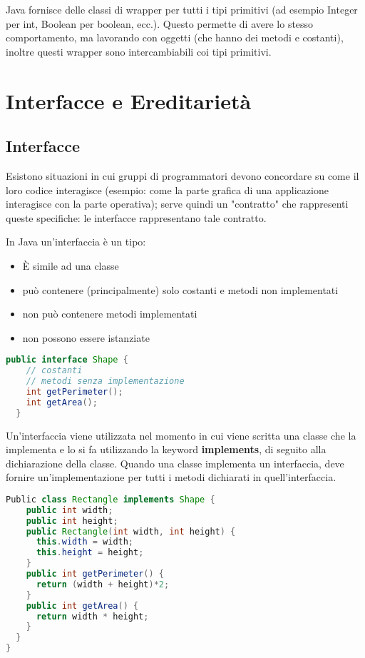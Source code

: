 \documentclass[a4paper,12pt,twoside]{book}
\begin{document}
Java fornisce delle classi di wrapper per tutti i tipi primitivi (ad
esempio Integer per int, Boolean per boolean, ecc.).  Questo permette
di avere lo stesso comportamento, ma lavorando con oggetti (che hanno
dei metodi e costanti), inoltre questi wrapper sono intercambiabili
coi tipi primitivi.


\chapter{Interfacce e Ereditarietà}

\section{Interfacce}
Esistono situazioni in cui gruppi di programmatori devono concordare
su come il loro codice interagisce (esempio: come la parte grafica di
una applicazione interagisce con la parte operativa); serve quindi un
"contratto" che rappresenti queste specifiche: le interfacce
rappresentano tale contratto.

In Java un'interfaccia è un tipo:
\begin{itemize}
\item È simile ad una classe
\item può contenere (principalmente) solo
  costanti e metodi non implementati
\item non può contenere metodi implementati
\item non possono essere istanziate
\end{itemize}


\begin{lstlisting}[caption={Interfaccia},
  label={lst:Interface},language=Java]
  public interface Shape {
    // costanti
    // metodi senza implementazione
    int getPerimeter();
    int getArea();
  }
\end{lstlisting}

Un'interfaccia viene utilizzata nel momento in cui viene scritta una
classe che la implementa e lo si fa utilizzando la keyword \textbf{implements}, di
seguito alla dichiarazione della classe. Quando una classe implementa
un interfaccia, deve fornire un'implementazione per tutti i metodi
dichiarati in quell'interfaccia.

\begin{lstlisting}[caption={Implementazione interfaccia},
  label={lst:Implements},language=Java]
  Public class Rectangle implements Shape {
    public int width;
    public int height;
    public Rectangle(int width, int height) {
      this.width = width;
      this.height = height;
    }
    public int getPerimeter() {
      return (width + height)*2;
    }
    public int getArea() {
      return width * height;
    }
  }
}
\end{lstlisting}
\end{document}
